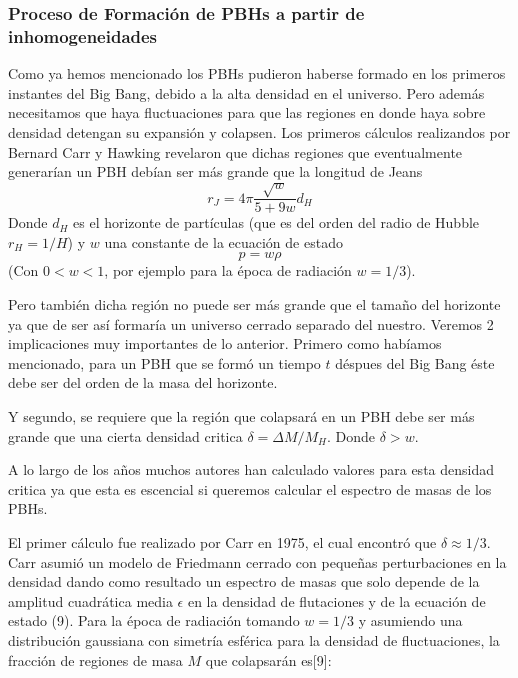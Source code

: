\documentclass{article}
\begin{document}
\subsubsection*{Proceso de Formaci\'on de PBHs a partir de inhomogeneidades}
Como ya hemos mencionado los PBHs pudieron haberse formado en los primeros instantes del Big Bang, debido a la alta densidad en el universo. Pero adem\'as necesitamos que haya fluctuaciones para que las regiones en donde haya sobre densidad detengan su expansi\'on y colapsen.
Los primeros c\'alculos realizandos por Bernard Carr y Hawking revelaron que dichas regiones que eventualmente generar\'ian un PBH deb\'ian ser m\'as grande que la longitud de Jeans
\begin{equation}
r_J=4\pi \frac{\sqrt{w}}{5+9w}d_H
\end{equation}
Donde $d_H$ es el horizonte de part\'iculas (que es del orden del radio de Hubble $r_H=1/H$) y $w$ una constante de la ecuaci\'on de estado
\begin{equation}
p=w\rho
\end{equation}
(Con $ 0<w<1$, por ejemplo para la \'epoca de radiaci\'on $w=1/3$).

Pero tambi\'en dicha regi\'on no puede ser m\'as grande que el tama\~no del horizonte ya que de ser as\'i formar\'ia un universo cerrado separado del nuestro.
Veremos 2 implicaciones muy importantes de lo anterior. Primero como hab\'iamos mencionado, para un PBH que se form\'o un tiempo $t$ d\'espues del Big Bang \'este debe ser del orden de la masa del horizonte. 

Y segundo, se requiere que la regi\'on que colapsar\'a en un PBH debe ser m\'as grande que una cierta densidad critica $\delta=\Delta M/M_{H}$. Donde $\delta > w$.

A lo largo de los a\~nos muchos autores han calculado valores para esta densidad critica ya que esta es escencial si queremos calcular el espectro de masas de los PBHs.

El primer c\'alculo fue realizado por Carr en 1975, el cual encontr\'o que $\delta \approx 1/3$. Carr asumi\'o un modelo de Friedmann cerrado con peque\~nas perturbaciones en la densidad dando como resultado un espectro de masas que solo depende de la amplitud cuadr\'atica media $\epsilon$ en la densidad de flutaciones y de la ecuaci\'on de estado (9).
Para la \'epoca de radiaci\'on tomando $w=1/3$ y asumiendo una distribuci\'on gaussiana con simetr\'ia esf\'erica para la densidad de fluctuaciones, la fracci\'on de regiones de masa $M$ que colapsar\'an es[9]:
\end{document}
